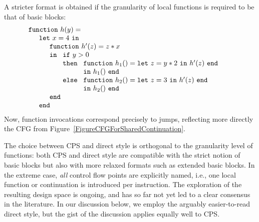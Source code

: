 A stricter format is obtained if the granularity of local functions is
required to be that of basic blocks:
\begin{equation}
\label{DirectStyleCode2}
\begin{array}{l}
\texttt{function}\ h (y) =\\
\quad
  \begin{array}{l}
    \texttt{let}\ x=4\ \texttt{in} \\
    \quad \begin{array}{l}
            \texttt{function}\ h' (z) = z*x \\
            \texttt{in}\
                \begin{array}[t]{l}
                  \texttt{if}\ y>0\\
                  \texttt{then}\ 
                     \begin{array}[t]{l}
                        \texttt{function}\ h_1 () = \texttt{let}\
                              z = y*2\ \texttt{in}\ h'(z)\ \texttt{end}\\
                        \texttt{in}\ h_1()\ \texttt{end}
                     \end{array}\\
                  \texttt{else}\ 
                     \begin{array}[t]{l}
                        \texttt{function}\ h_2 () = \texttt{let}\
                              z = 3\ \texttt{in}\ h'(z)\ \texttt{end}\\
                        \texttt{in}\ h_2()\ \texttt{end}
                     \end{array}
                \end{array}\\
            \texttt{end}
          \end{array} \\
    \texttt{end}
  \end{array}
\end{array}
\end{equation} 
Now, function invocations correspond precisely to jumps, reflecting
more directly the CFG from
Figure~\ref{FigureCFGForSharedContinuation}.  

The choice between CPS and direct style is orthogonal to the
granularity level of functions: both CPS and direct style are
compatible with the strict notion of basic blocks but also with more
relaxed formats such as extended basic blocks. In the extreme case,
\emph{all} control flow points are explicitly named, i.e., one local
function or continuation is introduced per instruction. The
exploration of the resulting design space is ongoing, and has so far
not yet led to a clear consensus in the literature. In our discussion
below, we employ the arguably easier-to-read direct style, but the
gist of the discussion applies equally well to CPS.

